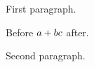 \documentclass{article}
\begin{document}
First paragraph.

Before $a+b  c$ after.

Second paragraph.
\end{document}

